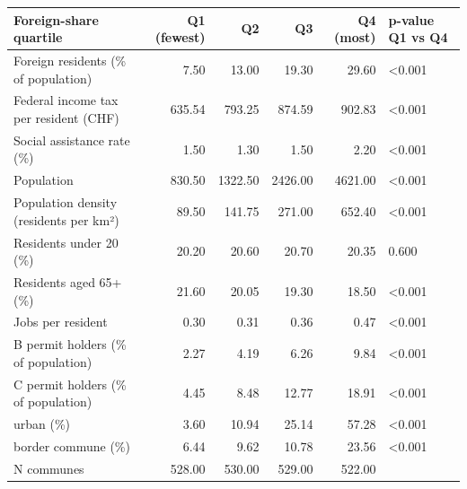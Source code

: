 \begin{tabular}{lrrrrl}
\toprule
Foreign-share quartile & Q1 (fewest) & Q2 & Q3 & Q4 (most) & p-value Q1 vs Q4 \\
\midrule
Foreign residents (\% of population) & 7.50 & 13.00 & 19.30 & 29.60 & <0.001 \\
Federal income tax per resident (CHF) & 635.54 & 793.25 & 874.59 & 902.83 & <0.001 \\
Social assistance rate (\%) & 1.50 & 1.30 & 1.50 & 2.20 & <0.001 \\
Population & 830.50 & 1322.50 & 2426.00 & 4621.00 & <0.001 \\
Population density (residents per km²) & 89.50 & 141.75 & 271.00 & 652.40 & <0.001 \\
Residents under 20 (\%) & 20.20 & 20.60 & 20.70 & 20.35 & 0.600 \\
Residents aged 65+ (\%) & 21.60 & 20.05 & 19.30 & 18.50 & <0.001 \\
Jobs per resident & 0.30 & 0.31 & 0.36 & 0.47 & <0.001 \\
B permit holders (\% of population) & 2.27 & 4.19 & 6.26 & 9.84 & <0.001 \\
C permit holders (\% of population) & 4.45 & 8.48 & 12.77 & 18.91 & <0.001 \\
urban (\%) & 3.60 & 10.94 & 25.14 & 57.28 & <0.001 \\
border commune (\%) & 6.44 & 9.62 & 10.78 & 23.56 & <0.001 \\
N communes & 528.00 & 530.00 & 529.00 & 522.00 &  \\
\bottomrule
\end{tabular}
